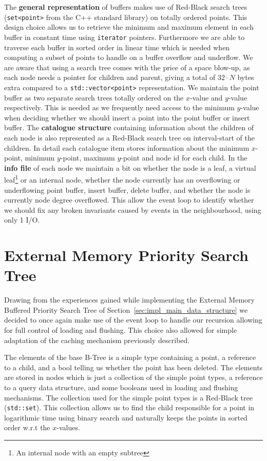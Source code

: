 \documentclass[twoside,11pt,openright]{report}
\begin{document}
The \textbf{general representation} of buffers makes use of Red-Black search trees (\texttt{set<point>} from the C++ standard library) on totally ordered points. This design choice allows us to retrieve the minimum and maximum element in each buffer in constant time using \texttt{iterator} pointers. Furthermore we are able to traverse each buffer in sorted order in linear time which is needed when computing a subset of points to handle on a buffer overflow and underflow. We are aware that using a search tree comes with the price of a space blow-up, as each node needs a pointer for children and parent, giving a total of $32 \cdot N$ bytes extra compared to a \texttt{std::vector<point>} representation. We maintain the point buffer as two separate search trees totally ordered on the $x$-value and $y$-value respectively. This is needed as we frequently need access to the minimum $y$-value when deciding whether we should insert a point into the point buffer or insert buffer. The \textbf{catalogue structure} containing information about the children of each node is also represented as a Red-Black search tree on interval-start of the children. In detail each catalogue item stores information about the minimum $x$-point, minimum $y$-point, maximum $y$-point and node id for each child. In the \textbf{info file} of each node we maintain a bit on whether the node is a leaf, a virtual leaf\footnote{An internal node with an empty subtree} or an internal node, whether the node currently has an overflowing or underflowing point buffer, insert buffer, delete buffer, and whether the node is currently node degree overflowed. This allow the event loop to identify whether we should fix any broken invariants caused by events in the neighbourhood, using only 1 I/O.

\section{External Memory Priority Search Tree}
Drawing from the experiences gained while implementing the External Memory Buffered Priority Search Tree of Section~\ref{sec:impl_main_data_structure} we decided to once again make use of the event loop to handle our recursion allowing for full control of loading and flushing. This choice also allowed for simple adaptation of the caching mechanism previously described.

The elements of the base B-Tree is a simple type containing a point, a reference to a child, and a bool telling us whether the point has been deleted. The elements are stored in nodes which is just a collection of the simple point types, a reference to a query data structure, and some booleans used in loading and flushing mechanisms. The collection used for the simple point types is a Red-Black tree (\texttt{std::set}). This collection allows us to find the child responsible for a point in logarithmic time using binary search and naturally keeps the points in sorted order w.r.t the $x$-values.
\end{document}
